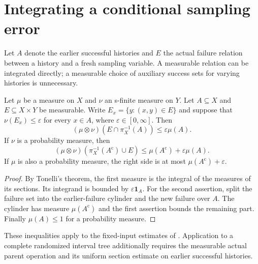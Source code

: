 \section{Integrating a conditional sampling error}

Let $A$ denote the earlier successful histories and $E$ the actual
failure relation between a history and a fresh sampling variable.
A measurable relation can be integrated directly; a measurable choice
of auxiliary success sets for varying histories is unnecessary.

\begin{lemma}
    \label{lem:guarded_sampling_sections}
    \leanok
    Let $\mu$ be a measure on $X$ and $\nu$ an s-finite measure on $Y$.
    Let $A\subseteq X$ and $E\subseteq X\times Y$ be measurable.
    Write $E_x=\{y:(x,y)\in E\}$ and suppose that
    $\nu(E_x)\le\varepsilon$ for every $x\in A$, where
    $\varepsilon\in[0,\infty]$. Then
    \[
        (\mu\otimes\nu)(E\cap\pi_X^{-1}(A))
        \le\varepsilon\mu(A).
    \]
    If $\nu$ is a probability measure, then
    \[
        (\mu\otimes\nu)(\pi_X^{-1}(A^{\mathrm c})\cup E)
        \le\mu(A^{\mathrm c})+\varepsilon\mu(A).
    \]
    If $\mu$ is also a probability measure, the right side is at most
    $\mu(A^{\mathrm c})+\varepsilon$.
\end{lemma}
\begin{proof}\leanok
    By Tonelli's theorem, the first measure is the integral of the
    measures of its sections. Its integrand is bounded by
    $\varepsilon\mathbf1_A$. For the second assertion, split the
    failure set into the earlier-failure cylinder and the new failure
    over $A$. The cylinder has measure $\mu(A^{\mathrm c})$ and the
    first assertion bounds the remaining part. Finally $\mu(A)\le1$
    for a probability measure.
\end{proof}

These inequalities apply to the fixed-input estimates of
\cite[Lemma \texttt{l:rs}, lines 530--558, and merge analysis,
    lines 1777--1817]{Arad2016RigorousRG}. Application to a complete
randomized interval tree additionally requires the measurable actual
parent operation and its uniform section estimate on earlier
successful histories.


